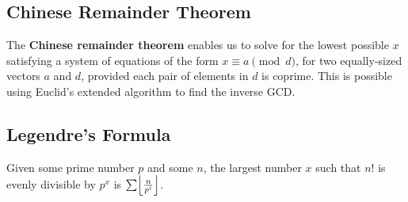 \documentclass[../main]{subfiles}
\begin{document}
    \subsection{Chinese Remainder Theorem}

    The \textbf{Chinese remainder theorem} enables us to solve for the lowest possible $x$ satisfying a system of equations of the form $x\equiv a \pmod {d}$, for two equally-sized vectors $a$ and $d$, provided each pair of elements in $d$ is coprime. This is possible using Euclid's extended algorithm to find the inverse GCD.

    \subsection{Legendre's Formula}

    Given some prime number $p$ and some $n$, the largest number $x$ such that $n!$ is evenly divisible by $p^x$ is $\sum\floor*{\frac{n}{p^i}}$.
\end{document}
